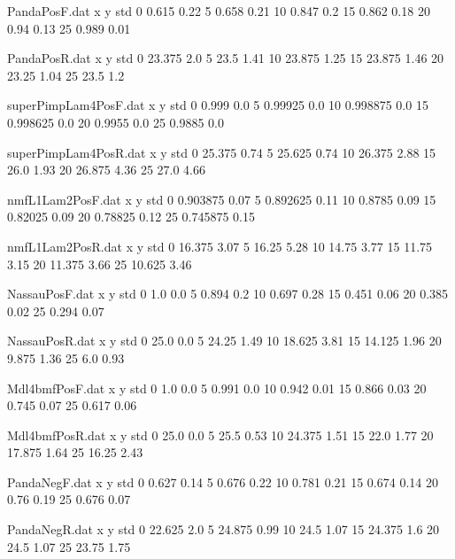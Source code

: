 \begin{filecontents}{PandaPosF.dat}
x y std
0 0.615 0.22
5 0.658 0.21
10 0.847 0.2
15 0.862 0.18
20 0.94 0.13
25 0.989 0.01
\end{filecontents}
\begin{filecontents}{PandaPosR.dat}
x y std
0 23.375 2.0
5 23.5 1.41
10 23.875 1.25
15 23.875 1.46
20 23.25 1.04
25 23.5 1.2
\end{filecontents}
\begin{filecontents}{superPimpLam4PosF.dat}
x y std
0 0.999 0.0
5 0.99925 0.0
10 0.998875 0.0
15 0.998625 0.0
20 0.9955 0.0
25 0.9885 0.0
\end{filecontents}
\begin{filecontents}{superPimpLam4PosR.dat}
x y std
0 25.375 0.74
5 25.625 0.74
10 26.375 2.88
15 26.0 1.93
20 26.875 4.36
25 27.0 4.66
\end{filecontents}
\begin{filecontents}{nmfL1Lam2PosF.dat}
x y std
0 0.903875 0.07
5 0.892625 0.11
10 0.8785 0.09
15 0.82025 0.09
20 0.78825 0.12
25 0.745875 0.15
\end{filecontents}
\begin{filecontents}{nmfL1Lam2PosR.dat}
x y std
0 16.375 3.07
5 16.25 5.28
10 14.75 3.77
15 11.75 3.15
20 11.375 3.66
25 10.625 3.46
\end{filecontents}
\begin{filecontents}{NassauPosF.dat}
x y std
0 1.0 0.0
5 0.894 0.2
10 0.697 0.28
15 0.451 0.06
20 0.385 0.02
25 0.294 0.07
\end{filecontents}
\begin{filecontents}{NassauPosR.dat}
x y std
0 25.0 0.0
5 24.25 1.49
10 18.625 3.81
15 14.125 1.96
20 9.875 1.36
25 6.0 0.93
\end{filecontents}
\begin{filecontents}{Mdl4bmfPosF.dat}
x y std
0 1.0 0.0
5 0.991 0.0
10 0.942 0.01
15 0.866 0.03
20 0.745 0.07
25 0.617 0.06
\end{filecontents}
\begin{filecontents}{Mdl4bmfPosR.dat}
x y std
0 25.0 0.0
5 25.5 0.53
10 24.375 1.51
15 22.0 1.77
20 17.875 1.64
25 16.25 2.43
\end{filecontents}
\begin{filecontents}{PandaNegF.dat}
x y std
0 0.627 0.14
5 0.676 0.22
10 0.781 0.21
15 0.674 0.14
20 0.76 0.19
25 0.676 0.07
\end{filecontents}
\begin{filecontents}{PandaNegR.dat}
x y std
0 22.625 2.0
5 24.875 0.99
10 24.5 1.07
15 24.375 1.6
20 24.5 1.07
25 23.75 1.75
\end{filecontents}
